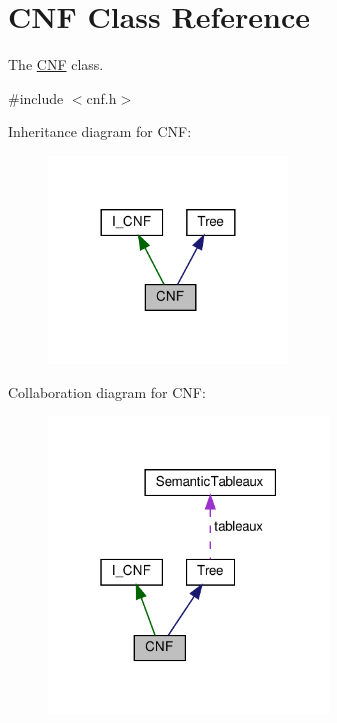 \hypertarget{class_c_n_f}{}\section{C\+NF Class Reference}
\label{class_c_n_f}


The \hyperlink{class_c_n_f}{C\+NF} class.  




{\ttfamily \#include $<$cnf.\+h$>$}



Inheritance diagram for C\+NF\+:\nopagebreak
\begin{figure}[H]
\begin{center}
\leavevmode
\includegraphics[width=180pt]{d2/d91/class_c_n_f__inherit__graph}
\end{center}
\end{figure}


Collaboration diagram for C\+NF\+:\nopagebreak
\begin{figure}[H]
\begin{center}
\leavevmode
\includegraphics[width=211pt]{d3/d9e/class_c_n_f__coll__graph}
\end{center}
\end{figure}
